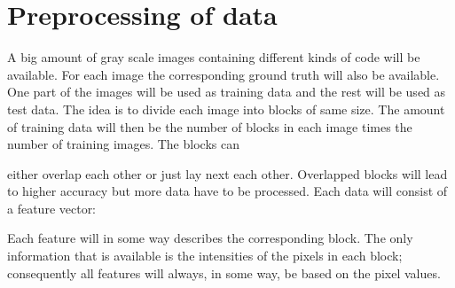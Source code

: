 \chapter{Preprocessing of data}
\label{sec:Preprocessing of data}

A big amount of gray scale images containing different kinds of code will be available. For each image the corresponding ground truth will also be available. One part of the images will be used as training data and the rest will be used as test data. The idea is to divide each image into blocks of same size. The amount of training data
will then be the number of blocks in each image times the number of training images. The blocks can 

either overlap each other or just lay next each other. Overlapped blocks will lead to higher accuracy but more data have to be processed. Each data will consist of a feature vector:

Each feature will in some way describes the corresponding block. The only information that is available is the intensities of the pixels in each block; consequently all features will always, in some way, be based on the pixel values.


